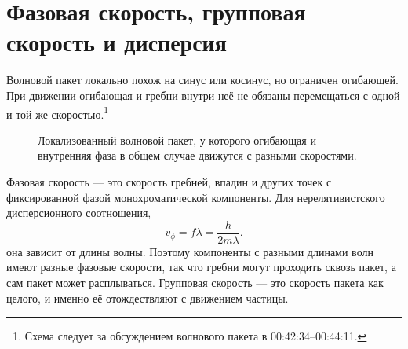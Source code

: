 \section{Фазовая скорость, групповая скорость и дисперсия}

\begin{classroomqa}
\end{classroomqa}

Волновой пакет локально похож на синус или косинус, но ограничен огибающей. При движении огибающая и гребни внутри неё не обязаны перемещаться с одной и той же скоростью.\footnote{Схема следует за обсуждением волнового пакета в 00:42:34--00:44:11.}

\begin{figure}[t]
\centering
{}
\caption{Локализованный волновой пакет, у которого огибающая и внутренняя фаза в общем случае движутся с разными скоростями.}
\end{figure}

Фазовая скорость — это скорость гребней, впадин и других точек с фиксированной фазой монохроматической компоненты. Для нерелятивистского дисперсионного соотношения,
\begin{equation}
v_\phi=f\lambda=\frac{h}{2m\lambda}.
\end{equation}
она зависит от длины волны. Поэтому компоненты с разными длинами волн имеют разные фазовые скорости, так что гребни могут проходить сквозь пакет, а сам пакет может расплываться. Групповая скорость — это скорость пакета как целого, и именно её отождествляют с движением частицы.

